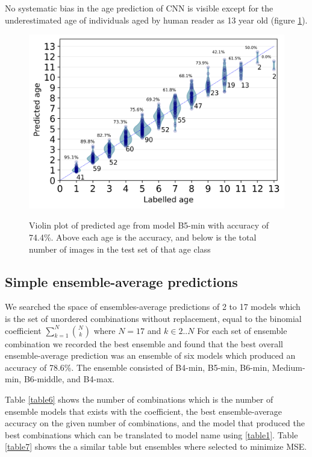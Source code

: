 \documentclass[10pt,letterpaper]{article}
\begin{document}
No systematic bias in the age prediction of CNN is visible except for the underestimated age of individuals aged by human reader as 13 year old (figure \ref{marker7}).

\begin{figure}
  \centering
  \caption{Violin plot of predicted age from model B5-min with accuracy of 74.4\%. 
  Above each age is the accuracy, and below is the total number of images 
  in the test set of that age class}
  \centering
  \includegraphics[scale=0.95]{results/eda/violin_plot_age.png}
  \label{marker7}
\end{figure}


\subsection*{Simple ensemble-average predictions}

We searched the space of ensembles-average predictions
of 2 to 17 models which is the set of unordered combinations without replacement,
equal to the binomial coefficient 
$\sum_{k=1}^{N}\binom{N}{k} $ where $N=17$ and $k \in 2..N$
For each set of ensemble combination we recorded the best 
ensemble and found that the best overall ensemble-average prediction 
was an ensemble of six models which produced an accuracy of 78.6\%. 
The ensemble consisted of B4-min, B5-min, B6-min, Medium-min, B6-middle, and B4-max.

Table \ref{table6} shows the number of combinations which is 
the number of ensemble models that exists with the coefficient,
the best ensemble-average accuracy on the given number of combinations,
and the model that produced the best combinations which can be
translated to model name using \ref{table1}. Table \ref{table7}
shows the a similar table but ensembles where selected to minimize MSE. 
\end{document}
